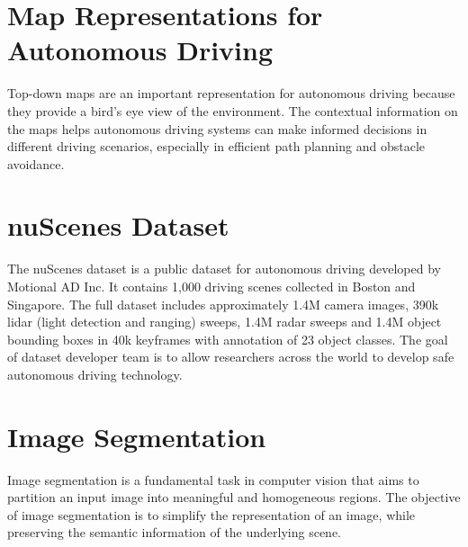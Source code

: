 \section{Map Representations for Autonomous Driving}

Top-down maps are an important representation for autonomous driving because they provide a bird's eye view of the environment. The contextual information on the maps helps autonomous driving systems can make informed decisions in different driving scenarios, especially in efficient path planning and obstacle avoidance. 


\section{nuScenes Dataset}

The nuScenes dataset is a public dataset for autonomous driving developed by Motional AD Inc. It contains 1,000 driving scenes collected in Boston and Singapore. The full dataset includes approximately 1.4M camera images, 390k lidar (light detection and ranging) sweeps, 1.4M radar sweeps and 1.4M object bounding boxes in 40k keyframes with annotation of 23 object classes. The goal of dataset developer team is to allow researchers across the world to develop safe autonomous driving technology. \cite{nuscenes2019}


\section{Image Segmentation}

Image segmentation is a fundamental task in computer vision that aims to partition an input image into meaningful and homogeneous regions. The objective of image segmentation is to simplify the representation of an image, while preserving the semantic information of the underlying scene.